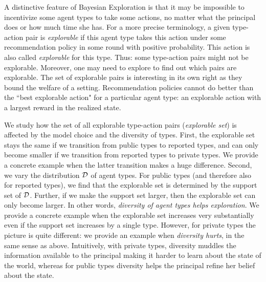 A distinctive feature of Bayesian Exploration is that it may be impossible to incentivize some agent types to take some actions, no matter what the principal does or how much time she has. For a more precise terminology, a given type-action pair is \emph{explorable} if this agent type takes this action under some recommendation policy in some round with positive probability. This action is also called \emph{explorable} for this type. Thus: some type-action pairs might not be explorable. Moreover, one may need to explore to find out which pairs are explorable.  The set of explorable pairs is interesting in its own right as they bound the welfare of a setting. Recommendation policies cannot do better than the ``best explorable action" for a particular agent type: an explorable action with a largest reward in the realized state.

We study how the set of all explorable type-action pairs (\emph{explorable set}) is affected by the model choice and the diversity of types. First,  the explorable set stays the same if we transition from public types to reported types, and can only become smaller if we transition from reported types to private types.
We provide a concrete example when the latter transition makes a huge difference. Second, we vary the distribution $\mathcal{D}$ of agent types. For public types (and therefore also for reported types), we find that the explorable set is determined by the support set of $\mathcal{D}$. Further, if we make the support set larger, then the explorable set can only become larger. In other words, \emph{diversity of agent types helps exploration}. We provide a concrete example when the explorable set increases very substantially even if the support set increases by a single type. However, for private types the picture is quite different: we provide an example when \emph{diversity hurts}, in the same sense as above. Intuitively, with private types, diversity muddles the information available to the principal making it harder to learn about the state of the world, whereas for public types diversity helps the principal refine her belief about the state.

